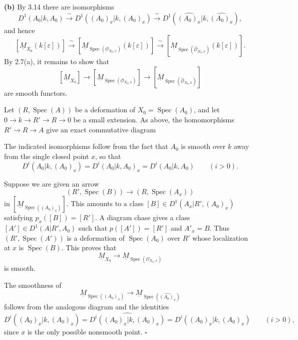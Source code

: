 \smallskip
\noindent\textbf{(b)}
By 3.14 there are isomorphisms
\[
D^1(A_0|k,A_0)
\xrightarrow{\ \sim\ }
D^1((A_0)_x|k,(A_0)_x)
\xrightarrow{\ \sim\ }
D^1(\widehat{(A_0)_x}|k,\widehat{(A_0)_x}),
\]
and hence
\[
[\underline M_{X_0}(k[\varepsilon])]
\xrightarrow{\ \sim\ }
[\underline M_{\operatorname{Spec}(\mathcal O_{X_0,x})}
 (k[\varepsilon])]
\xrightarrow{\ \sim\ }
[\underline M_{\operatorname{Spec}(\widehat{\mathcal O}_{X_0,x})}
 (k[\varepsilon])].
\]
By 2.7(a), it remains to show that
\[
[\underline M_{X_0}]
\longrightarrow
[\underline M_{\operatorname{Spec}(\mathcal O_{X_0,x})}]
\longrightarrow
[\underline M_{\operatorname{Spec}(\widehat{\mathcal O}_{X_0,x})}]
\]
are smooth functors.

Let $(R,\operatorname{Spec}(A))$ be a deformation of
$X_0=\operatorname{Spec}(A_0)$, and let
$0\longrightarrow k\longrightarrow R'\longrightarrow R
\longrightarrow0$ be a small extension. As above, the homomorphisms
$R'\longrightarrow R\longrightarrow A$ give an exact commutative
diagram


\begin{center}
\scriptsize
{}
\end{center}
The indicated isomorphisms follow from the fact that $A_0$ is smooth
over $k$ away from the single closed point $x$, so that
\[
D^i(A_0|k,(A_0)_x)
=D^i(A_0|k,A_0)_x
=D^i(A_0|k,A_0)
\qquad(i>0).
\]

Suppose we are given an arrow
\[
(R',\operatorname{Spec}(B))
\longrightarrow(R,\operatorname{Spec}(A_x))
\]
in $[\underline M_{\operatorname{Spec}((A_0)_x)}]$. This amounts to
a class $[B]\in D^1(A_x|R',(A_0)_x)$ satisfying
$p_x([B])=[R']$. A diagram chase gives a class
$[A']\in D^1(A|R',A_0)$ such that $p([A'])=[R']$ and $A'_x=B$.
Thus $(R',\operatorname{Spec}(A'))$ is a deformation of
$\operatorname{Spec}(A_0)$ over $R'$ whose localization at $x$ is
$\operatorname{Spec}(B)$. This proves that
\[
\underline M_{X_0}\longrightarrow
\underline M_{\operatorname{Spec}(\mathcal O_{X_0,x})}
\]
is smooth.

The smoothness of
\[
\underline M_{\operatorname{Spec}((A_0)_x)}
\longrightarrow
\underline M_{\operatorname{Spec}(\widehat{(A_0)_x})}
\]
follows from the analogous diagram and the identities
\[
D^i((A_0)_x|k,\widehat{(A_0)_x})
=\widehat{D^i((A_0)_x|k,(A_0)_x)}
=D^i((A_0)_x|k,(A_0)_x)
\qquad(i>0),
\]
since $x$ is the only possible nonsmooth point. \hfill$\square$
